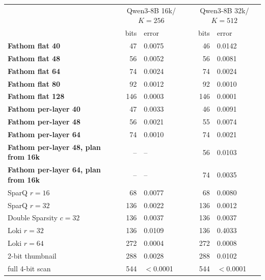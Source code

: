 \begin{tabular}{lrlrl}
\toprule
 & \multicolumn{2}{c}{Qwen3-8B 16k/$K{=}256$} & \multicolumn{2}{c}{Qwen3-8B 32k/$K{=}512$} \\
 & bits & error & bits & error \\
\midrule
\textbf{Fathom flat 40} & 47 & 0.0075 & 46 & 0.0142 \\
\textbf{Fathom flat 48} & 56 & 0.0052 & 56 & 0.0081 \\
\textbf{Fathom flat 64} & 74 & 0.0024 & 74 & 0.0024 \\
\textbf{Fathom flat 80} & 92 & 0.0012 & 92 & 0.0010 \\
\textbf{Fathom flat 128} & 146 & 0.0003 & 146 & 0.0001 \\
\textbf{Fathom per-layer 40} & 47 & 0.0033 & 46 & 0.0091 \\
\textbf{Fathom per-layer 48} & 56 & 0.0021 & 55 & 0.0074 \\
\textbf{Fathom per-layer 64} & 74 & 0.0010 & 74 & 0.0021 \\
\textbf{Fathom per-layer 48, plan from 16k} & -- & -- & 56 & 0.0103 \\
\textbf{Fathom per-layer 64, plan from 16k} & -- & -- & 74 & 0.0035 \\
SparQ $r{=}16$ & 68 & 0.0077 & 68 & 0.0080 \\
SparQ $r{=}32$ & 136 & 0.0022 & 136 & 0.0012 \\
Double Sparsity $c{=}32$ & 136 & 0.0037 & 136 & 0.0037 \\
Loki $r{=}32$ & 136 & 0.0109 & 136 & 0.4033 \\
Loki $r{=}64$ & 272 & 0.0004 & 272 & 0.0008 \\
2-bit thumbnail & 288 & 0.0028 & 288 & 0.0102 \\
full 4-bit scan & 544 & $<$0.0001 & 544 & $<$0.0001 \\
\bottomrule
\end{tabular}